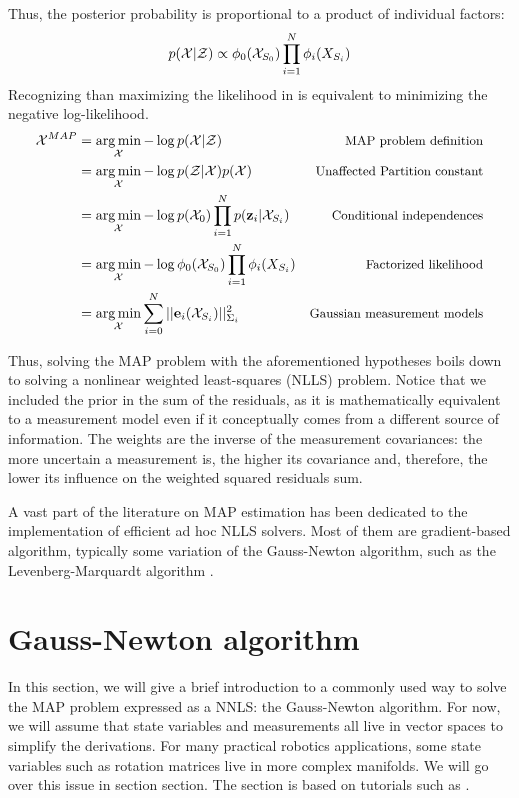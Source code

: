 Thus, the posterior probability is proportional to a product of individual factors:
%
\begin{equation}
    p(\mathcal{X} | \mathcal{Z}) \propto \phi_0(\mathcal{X}_{S_0}) \prod_{i=1}^{N} \phi_i(X_{S_i}) 
    \label{eq:likelihood_factorization}
\end{equation}
%
Recognizing than maximizing the likelihood in  is equivalent to minimizing the negative log-likelihood.
%
\begin{align}
    \mathcal{X}^{MAP} 
    &= \operatorname*{arg\,min}_{\mathcal{X}} - \log p(\mathcal{X} | \mathcal{Z}) &\text{\small MAP problem definition}
    \\
    &= \operatorname*{arg\,min}_{\mathcal{X}} - \log p(\mathcal{Z} | \mathcal{X}) p(\mathcal{X}) &\text{\small Unaffected Partition constant}
    \\
    &= \operatorname*{arg\,min}_{\mathcal{X}} - \log p(\mathcal{X}_0) \prod_{i=1}^{N} p({\bf z}_i | \mathcal{X}_{S_i})  &\text{\small Conditional independences}
    \\
    &= \operatorname*{arg\,min}_{\mathcal{X}} - \log \phi_0(\mathcal{X}_{S_0}) \prod_{i=1}^{N} \phi_i(X_{S_i}) &\text{\small Factorized likelihood}
    \\
    &= \operatorname*{arg\,min}_{\mathcal{X}}  \sum_{i=0}^{N} ||{\bf e}_i(\mathcal{X}_{S_i})||_{\Sigma_i}^2  &\text{\small Gaussian measurement models}
\end{align}

Thus, solving the MAP problem with the aforementioned hypotheses boils down to solving a nonlinear weighted least-squares (NLLS) problem.
Notice that we included the prior in the sum of the residuals, as it is mathematically equivalent to a measurement model even if it conceptually
comes from a different source of information. 
The weights are the inverse of the measurement covariances: the more uncertain a measurement is, the higher its covariance and, therefore, the lower its influence
on the weighted squared residuals sum. 

A vast part of the literature on MAP estimation has been dedicated to the implementation of efficient ad hoc NLLS solvers. Most of them are 
gradient-based algorithm, typically some variation of the Gauss-Newton algorithm, such as the Levenberg-Marquardt algorithm \cite{boyd2004convex}.





%
%
%
%
%
%
%
\section{Gauss-Newton algorithm}
In this section, we will give a brief introduction to a commonly used way to solve the MAP problem expressed as a NNLS: the Gauss-Newton algorithm.
For now, we will assume that state variables and measurements all live in vector spaces to simplify the derivations. For many practical robotics applications,
some state variables such as rotation matrices live in more complex manifolds. We will go over this issue in section section. 
The section is based on tutorials such as \cite{dellaert2017factor,sola2017course}. 

